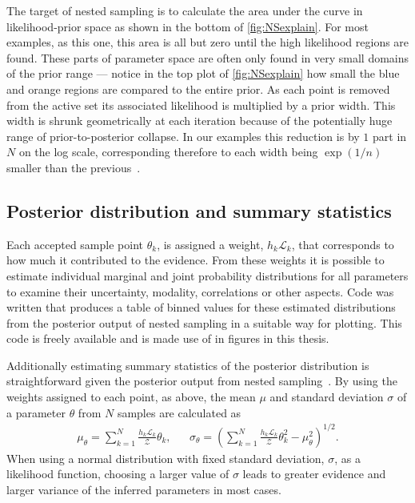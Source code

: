 The target of nested sampling is to calculate the area under the curve in likelihood-prior space as shown in the bottom of \autoref{fig:NSexplain}.
For most examples, as this one, this area is all but zero until the high likelihood regions are found.
These parts of parameter space are often only found in very small domains of the prior range --- notice in the top plot of \autoref{fig:NSexplain} how small the blue and orange regions are compared to the entire prior.
As each point is removed from the active set its associated likelihood is multiplied by a prior width.
This width is shrunk geometrically at each iteration because of the potentially huge range of prior-to-posterior collapse.
In our examples this reduction is by $1$ part in $N$ on the log scale, corresponding therefore to each width being $\exp(1/n)$ smaller than the previous~\cite{Skilling2006, sivia2006}.

\subsection{Posterior distribution and summary statistics}\label{sec:summaryStats}
Each accepted sample point $\theta_k$, is assigned a weight, $h_k \mathcal L_k$, that corresponds to how much it contributed to the evidence.
From these weights it is possible to estimate individual marginal and joint probability distributions for all parameters to examine their uncertainty, modality, correlations or other aspects.
Code was written that produces a table of binned values for these estimated distributions from the posterior output of nested sampling in a suitable way for plotting.
This code is freely available and is made use of in figures in this thesis.

Additionally estimating summary statistics of the posterior distribution is straightforward given the posterior output from nested sampling~\cite{Skilling2006, sivia2006}.
By using the weights assigned to each point, as above, the mean $\mu$ and standard deviation $\sigma$ of a parameter $\theta$ from $N$ samples are calculated as
\begin{align*}
\mu_\theta = \sum_{k=1}^{N}  \frac{h_k \mathcal L_k}{\mathcal Z}
\theta_k, &&
\sigma_\theta = \left(\sum_{k=1}^{N} \frac{h_k \mathcal L_k}{\mathcal Z}
  \theta_k^2 - \mu_\theta^2\right)^{1/2}.
\end{align*}
When using a normal distribution with fixed standard deviation, $\sigma$, as a likelihood function, choosing a larger value of $\sigma$ leads to greater evidence and larger variance of the inferred parameters in most cases.

